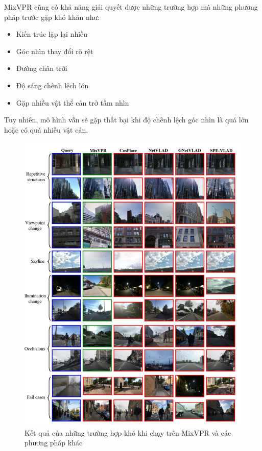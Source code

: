 MixVPR cũng có khả năng giải quyết được những trường hợp mà những phương pháp trước gặp khó khăn như:
\begin{itemize}
    \item Kiến trúc lặp lại nhiều
    \item Góc nhìn thay đổi rõ rệt
    \item Đường chân trời
    \item Độ sáng chênh lệch lớn
    \item Gặp nhiều vật thể cản trở tầm nhìn
\end{itemize}
Tuy nhiên, mô hình vẫn sẽ gặp thất bại khi độ chênh lệch góc nhìn là quá lớn hoặc có quá nhiều vật cản.

\begin{figure}[H]
    \centering
    \includegraphics[scale=0.5]{pics/Proposal/fail.png}
    \caption{Kết quả của những trường hợp khó khi chạy trên MixVPR và các phương pháp khác \cite{alibey2023mixvpr}}
\end{figure}

